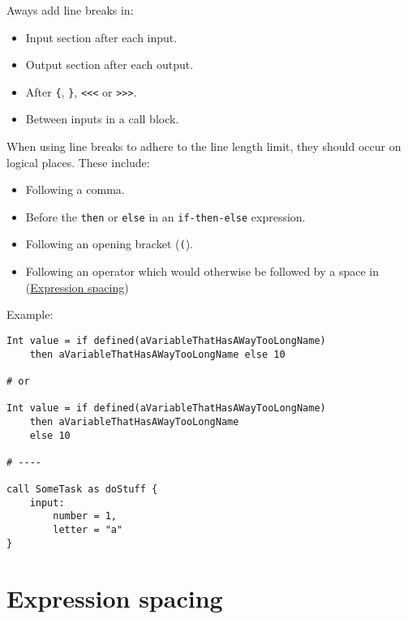 \documentclass[
]{book}
\providecommand{\tightlist}{%
  \setlength{\itemsep}{0pt}\setlength{\parskip}{0pt}}
\begin{document}
Aways add line breaks in:

\begin{itemize}
\tightlist
\item
  Input section after each input.
\item
  Output section after each output.
\item
  After \texttt{\{}, \texttt{\}}, \texttt{\textless{}\textless{}\textless{}} or \texttt{\textgreater{}\textgreater{}\textgreater{}}.
\item
  Between inputs in a call block.
\end{itemize}

When using line breaks to adhere to the line length limit, they should occur
on logical places. These include:

\begin{itemize}
\tightlist
\item
  Following a comma.
\item
  Before the \texttt{then} or \texttt{else} in an \texttt{if-then-else} expression.
\item
  Following an opening bracket (\texttt{(}).
\item
  Following an operator which would otherwise be followed by a space in
  (\protect\hyperlink{expression-spacing}{Expression spacing})
\end{itemize}

Example:

\begin{verbatim}
Int value = if defined(aVariableThatHasAWayTooLongName)
    then aVariableThatHasAWayTooLongName else 10

# or

Int value = if defined(aVariableThatHasAWayTooLongName)
    then aVariableThatHasAWayTooLongName
    else 10

# ----

call SomeTask as doStuff {
    input:
        number = 1,
        letter = "a"
}
\end{verbatim}

\hypertarget{expression-spacing}{%
\section{Expression spacing}\label{expression-spacing}}
\end{document}

